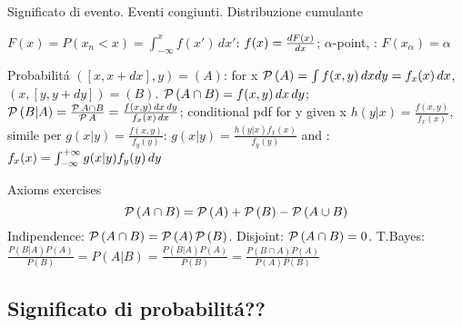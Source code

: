 \begin{frame}{Significato di evento. Eventi congiunti. Distribuzione cumulante}
\begin{block}{}
$F(x)=P(x_n<x)=\int_{-\infty}^xf(x')\,dx'$: $f(x)=\TDy{x}{F(x)}$; $\alpha$-point, : $F(x_{\alpha})=\alpha$
\end{block}
\begin{block}{}
Probabilit\'a $([x,x+dx],y)=(A)$:  for x $\prob{(A)}=\int f(x,y)\,dxdy=f_x(x)\,dx$, $(x,[y,y+dy])=(B)$.
$\prob{(A\cap B)}=f(x,y)\,dx\,dy$;  $\prob{(B|A)}=\frac{\prob{A\cap B}}{\prob{A}}=\frac{f(x,y)\,dx\,dy}{f_x(x)\,dx}$; conditional pdf for y given x $h(y|x)=\frac{f(x,y)}{f_x(x)}$, simile per $g(x|y)=\frac{f(x,y)}{f_y(y)}$:  $g(x|y)=\frac{h(y|x)f_x(x)}{f_y(y)}$ and : $f_x(x)=\intsinf{}g(x|y)f_y(y)\,dy$
\end{block}
\end{frame}

\begin{wordonframe}{Axioms exercises}
\[\prob{(A\cap B)}=\prob{(A)}+\prob{(B)}-\prob{(A\cup B)}\]
Indipendence: $\prob{(A\cap B)}=\prob{(A)}\prob{(B)}$.
Disjoint: $\prob{(A\cap B)}=0$.
T.Bayes: $\frac{P(B|A)P(A)}{P(B)}=P(A|B)=\frac{P(B|A)P(A)}{P(B)}=\frac{P(B\cap A)P(A)}{P(A)P(B)}$
\end{wordonframe}

\subsection{Significato di probabilit\'a??}

